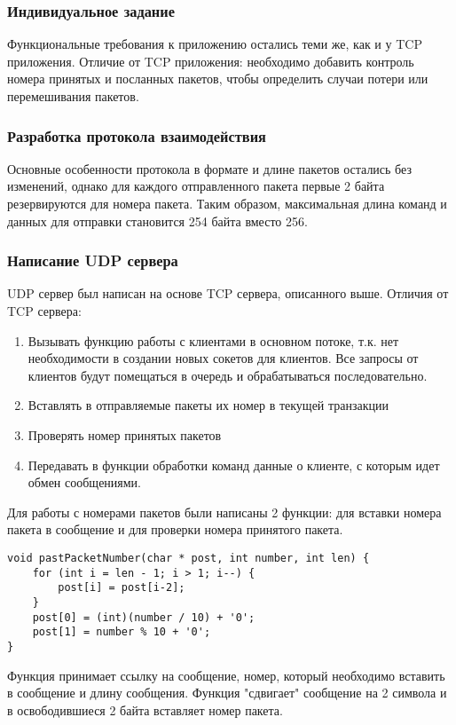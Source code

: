 \subsubsection{Индивидуальное задание}
Функциональные требования к приложению остались теми же, как и у TCP приложения. Отличие от TCP приложения: необходимо добавить контроль номера принятых и посланных пакетов, чтобы определить случаи потери или перемешивания пакетов.
\subsubsection{Разработка протокола взаимодействия}
Основные особенности протокола в формате и длине пакетов остались без изменений, однако для каждого отправленного пакета первые 2 байта резервируются для номера пакета. Таким образом, максимальная длина команд и данных для отправки становится 254 байта вместо 256.

\subsubsection{Написание UDP сервера}
UDP сервер был написан на основе TCP сервера, описанного выше. Отличия от TCP сервера:
\begin{enumerate}
\item Вызывать функцию работы с клиентами в основном потоке, т.к. нет необходимости в создании новых сокетов для клиентов. Все запросы от клиентов будут помещаться в очередь и обрабатываться последовательно. 
\item Вставлять в отправляемые пакеты их номер в текущей транзакции
\item Проверять номер принятых пакетов
\item Передавать в функции обработки команд данные о клиенте, с которым идет обмен сообщениями.
\end{enumerate}

Для работы с номерами пакетов были написаны 2 функции: для вставки номера пакета в сообщение и для проверки номера принятого пакета.
\begin{lstlisting}
void pastPacketNumber(char * post, int number, int len) {
    for (int i = len - 1; i > 1; i--) {
        post[i] = post[i-2];
    }
    post[0] = (int)(number / 10) + '0';
    post[1] = number % 10 + '0';
}
\end{lstlisting}
Функция принимает ссылку на сообщение, номер, который необходимо вставить в сообщение и длину сообщения. Функция "сдвигает" сообщение на 2 символа и в освободившиеся 2 байта вставляет номер пакета.

